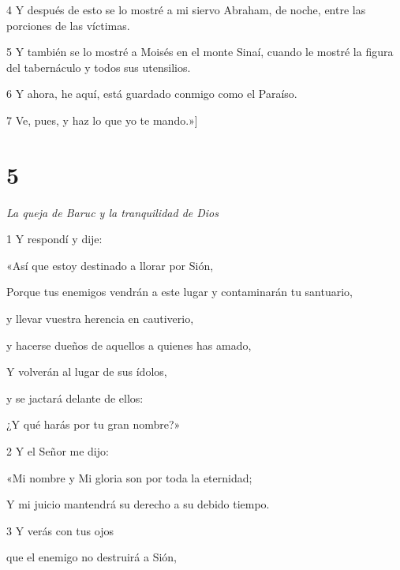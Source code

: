 \par 4 Y después de esto se lo mostré a mi siervo Abraham, de noche, entre las porciones de las víctimas.

\par 5 Y también se lo mostré a Moisés en el monte Sinaí, cuando le mostré la figura del tabernáculo y todos sus utensilios.

\par 6 Y ahora, he aquí, está guardado conmigo como el Paraíso.

\par 7 Ve, pues, y haz lo que yo te mando.»]

\chapter{5}

\par \textit{La queja de Baruc y la tranquilidad de Dios}

\par 1 Y respondí y dije:

\par «Así que estoy destinado a llorar por Sión,

\par Porque tus enemigos vendrán a este lugar y contaminarán tu santuario,

\par y llevar vuestra herencia en cautiverio,

\par y hacerse dueños de aquellos a quienes has amado,

\par Y volverán al lugar de sus ídolos,

\par y se jactará delante de ellos:

\par ¿Y qué harás por tu gran nombre?»

\par 2 Y el Señor me dijo:

\par «Mi nombre y Mi gloria son por toda la eternidad;

\par Y mi juicio mantendrá su derecho a su debido tiempo.

\par 3 Y verás con tus ojos

\par que el enemigo no destruirá a Sión,

